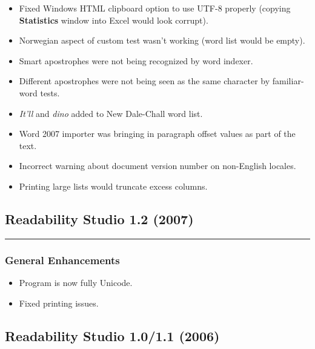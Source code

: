 \documentclass[
]{book}
\providecommand{\tightlist}{%
  \setlength{\itemsep}{0pt}\setlength{\parskip}{0pt}}
\theoremstyle{definition}
\theoremstyle{definition}
\theoremstyle{definition}
\theoremstyle{definition}
\theoremstyle{remark}
\begin{document}
\begin{itemize}
\tightlist
\item
  Fixed Windows HTML clipboard option to use UTF-8 properly (copying \textbf{Statistics} window into Excel would look corrupt).
\item
  Norwegian aspect of custom test wasn't working (word list would be empty).
\item
  Smart apostrophes were not being recognized by word indexer.
\item
  Different apostrophes were not being seen as the same character by familiar-word tests.
\item
  \emph{It'll} and \emph{dino} added to New Dale-Chall word list.
\item
  Word 2007 importer was bringing in paragraph offset values as part of the text.
\item
  Incorrect warning about document version number on non-English locales.
\item
  Printing large lists would truncate excess columns.
\end{itemize}

\hypertarget{readability-studio-1.2-2007}{%
\subsection*{Readability Studio 1.2 (2007)}\label{readability-studio-1.2-2007}}

\begin{center}\rule{0.5\linewidth}{0.5pt}\end{center}

\hypertarget{general-enhancements-5}{%
\subsubsection*{General Enhancements}\label{general-enhancements-5}}

\begin{itemize}
\tightlist
\item
  Program is now fully Unicode.
\item
  Fixed printing issues.
\end{itemize}

\hypertarget{readability-studio-1.01.1-2006}{%
\subsection*{Readability Studio 1.0/1.1 (2006)}\label{readability-studio-1.01.1-2006}}
\end{document}
